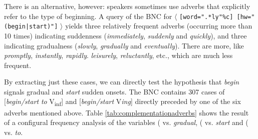 There is an alternative, however: speakers sometimes use adverbs that explicitly refer to the type of beginning. A query of the BNC for $\langle$ \texttt{[word=".*ly"\%c] [hw="(begin|start)"]} $\rangle$ yields three relatively frequent adverbs (occurring more than 10 times) indicating suddenness (\textit{immediately}, \textit{suddenly} and \textit{quickly}), and three indicating gradualness (\textit{slowly}, \textit{gradually} and \textit{eventually}). There are more, like \textit{promptly}, \textit{instantly}, \textit{rapidly}. \textit{leisurely}, \textit{reluctantly}, etc., which are much less frequent.

By extracting just these cases, we can directly test the hypothesis that \textit{begin} signals gradual and \textit{start} sudden onsets. The BNC contains 307 cases of [\textit{begin/start} \textit{to} V\textsubscript{inf}] and [\textit{begin/start} V\textit{ing}] directly preceded by one of the six adverbs mentioned above. Table \ref{tab:complementationadverbs} shows the result of a configural frequency analysis of the variables  ( vs. \textit{gradual},  ( vs. \textit{start} and  ( vs. \textit{to}.

